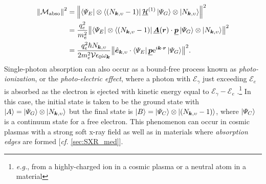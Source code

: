 \begin{align}
 \begin{split}
 \norm{\mathcal{M}_{\text{abso}}}^2 &= \norm{\bra{\Psi_E} \otimes \bra{\left( N_{\mathbold{k},\upsilon} -1 \right)} \underline{\mathcal{H}}^{(1)} \ket{\Psi_G} \otimes \ket{N_{\mathbold{k},\upsilon}}}^2 \\ 
 &= \frac{q_e^2}{m_e^2} \norm{\bra{\Psi_E} \otimes \bra{\left( N_{\mathbold{k},\upsilon} -1 \right)} \underline{\mathbold{A}} ( \mathbold{r} ) \cdot \underline{\mathbold{p}} \ket{\Psi_G} \otimes \ket{N_{\mathbold{k},\upsilon}}}^2 \\
 &= \frac{q_e^2 \hbar N_{\mathbold{k},\upsilon}}{2 m_e^2 \mathcal{V} \epsilon_0 \omega_{\mathbold{k}}} \norm{\hat{\mathbold{e}}_{\mathbold{k},\upsilon} \cdot \bra{\Psi_E} \underline{\mathbold{p}} \mathrm{e}^{ i \mathbold{k} \cdot \mathbold{r}} \ket{\Psi_G}}^2 .
 \end{split}
 \end{align}
Single-photon absorption can also occur as a bound-free process known as \emph{photo-ionization}, or the \emph{photo-electric effect}, where a photon with $\mathcal{E}_{\gamma}$ just exceeding $\mathcal{E}_e$ is absorbed as the electron is ejected with kinetic energy equal to $\mathcal{E}_{\gamma} - \mathcal{E}_e$ \cite{Kahn02}.\footnote{\emph{e.g.}, from a highly-charged ion in a cosmic plasma or a neutral atom in a material} 
In this case, the initial state is taken to be the ground state with $\ket{A} = \ket{\Psi_G} \otimes \ket{N_{\mathbold{k},\upsilon}}$ but the final state is $\ket{B} = \ket{\Psi_C} \otimes \ket{\left( N_{\mathbold{k},\upsilon} - 1 \right)}$, where $\ket{\Psi_C}$ is a continuum state for a free electron. 
This phenomenon can occur in cosmic plasmas with a strong soft x-ray field as well as in materials where \emph{absorption edges} are formed [\emph{cf.\@} \cref{sec:SXR_med}]. 

